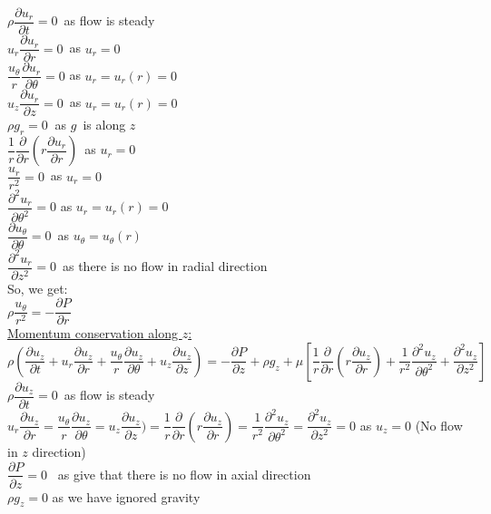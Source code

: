 \documentclass{article}
\begin{document}
\noindent $\rho \dfrac{\partial u_r}{\partial t}=0$\ as flow is steady\\$u_r\dfrac{\partial u_r}{\partial r}=0$\ as $u_r=0$\\
$\dfrac{u_\theta}{r}\dfrac{\partial u_r}{\partial \theta}=0$ as $u_r=u_r(r)=0$\\
$u_z\dfrac{\partial u_r}{\partial z}=0$\ as $u_r=u_r(r)=0$\\
$\rho g_r=0\  $ as $g $\ is along $z$ \\
$\dfrac{1}{r}\dfrac{\partial}{\partial r}(r\dfrac{\partial u_r}{\partial r})$\ as $u_r=0$\\
$\dfrac{u_r}{r^2}=0$\ as $u_r=0$\\
$\dfrac{\partial^2 u_r}{\partial \theta^2}=0$ as $u_r=u_r(r)=0$\\
$\dfrac{\partial u_\theta}{\partial \theta}=0$\ as $u_\theta=u_\theta(r)$ \\
$\dfrac{\partial^2 u_r}{\partial z^2}=0$\ as there is no flow in radial direction\\

\noindent So, we get: \\

\noindent $\rho \dfrac{u_\theta}{r^2}= -\dfrac{\partial P}{\partial r}$\\

\noindent \underline{Momentum conservation along $z$:}\\
$\rho (\dfrac{\partial u_z}{\partial t}+ u_r\dfrac{\partial u_z}{\partial r} + \dfrac{u_\theta}{r}\dfrac{\partial u_z}{\partial \theta} + u_z\dfrac{\partial u_z}{\partial z}) = -\dfrac{\partial P}{\partial z}+ \rho g_z + \mu[\dfrac{1}{r}\dfrac{\partial}{\partial r}(r\dfrac{\partial u_z}{\partial r}) + \dfrac{1}{r^2}\dfrac{\partial^2 u_z}{\partial \theta^2} + \dfrac{\partial^2 u_z}{\partial z^2}]$\\

\noindent $\rho \dfrac{\partial u_z}{\partial t}=0$\ as flow is steady \\
\noindent $u_r\dfrac{\partial u_z}{\partial r}=\dfrac{u_\theta}{r}\dfrac{\partial u_z}{\partial \theta}=u_z\dfrac{\partial u_z}{\partial z}) = \dfrac{1}{r}\dfrac{\partial}{\partial r}(r\dfrac{\partial u_z}{\partial r})= \dfrac{1}{r^2}\dfrac{\partial^2 u_z}{\partial \theta^2}=\dfrac{\partial^2 u_z}{\partial z^2}=0$ as $u_z=0$ (No flow in $z$ direction) \\
$\dfrac{\partial P}{\partial z} =0$ \ as give that there is no flow in axial direction \\
$\rho g_z=0$ as we have ignored gravity \\
\end{document}
